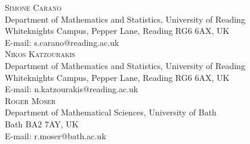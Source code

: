 \documentclass[a4paper,11pt]{article}
\numberwithin{equation}{section}
\theoremstyle{definition}
\begin{document}
\vspace{3mm}
\textsc{Simone Carano}\\
Department of Mathematics and Statistics, University of Reading\\
Whiteknights Campus, Pepper Lane, Reading RG6 6AX, UK\\
E-mail: s.carano@reading.ac.uk\\

\textsc{Nikos Katzourakis}\\
Department of Mathematics and Statistics, University of Reading\\
Whiteknights Campus, Pepper Lane, Reading RG6 6AX, UK\\
E-mail: n.katzourakis@reading.ac.uk\\

\textsc{Roger Moser}\\
Department of Mathematical Sciences, University of Bath\\
Bath BA2 7AY, UK\\
E-mail: r.moser@bath.ac.uk
\end{document}
